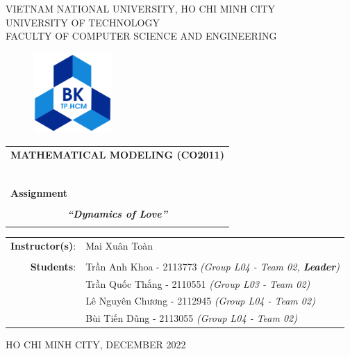 \documentclass[a4paper]{article}
\begin{document}
\begin{titlepage}
\begin{center}
VIETNAM NATIONAL UNIVERSITY, HO CHI MINH CITY \\
UNIVERSITY OF TECHNOLOGY \\
FACULTY OF COMPUTER SCIENCE AND ENGINEERING
\end{center}

\vspace{1cm}

\begin{figure}[h!]
\begin{center}
\includegraphics[width=3cm]{hcmut.png}
\end{center}
\end{figure}

\vspace{1cm}


\begin{center}
\begin{tabular}{c}
\multicolumn{1}{l}{\textbf{{\Large MATHEMATICAL MODELING (CO2011)}}}\\
~~\\
\hline
\\
\multicolumn{1}{l}{\textbf{{\Large Assignment}}}\\
\\
\textbf{\textit{{\Huge “Dynamics of Love”}}}\\
\\
\hline
\end{tabular}
\end{center}

\vspace{2cm}

\begin{table}[h]
\centering
    \begin{tabular}{rl}
    \hspace{3 cm}\textbf{Instructor(s)}:
    & Mai Xuân Toàn\\

    & \\[10pt]
    \textbf{Students}: &  Trần Anh Khoa - 2113773 \emph{(Group L04 - Team 02, \textbf{Leader})} \\
    &  Trần Quốc Thắng - 2110551 \emph{(Group L03 - Team 02)}\\
    &  Lê Nguyên Chương - 2112945 \emph{(Group L04 - Team 02)}\\
    &  Bùi Tiến Dũng - 2113055 \emph{(Group L04 - Team 02)}\\
    \end{tabular}
\end{table}

\begin{center}
{\footnotesize HO CHI MINH CITY, DECEMBER 2022}
\end{center}
\end{titlepage}
\end{document}
